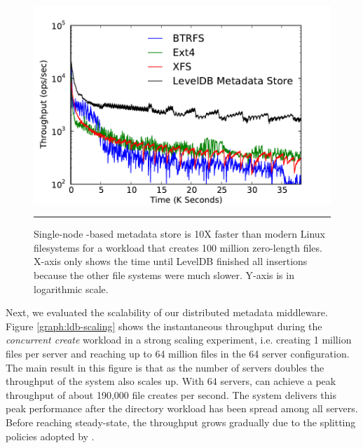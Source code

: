 \begin{figure}[t]  %
\centerline{\includegraphics[scale=0.45]{./figs/ldb_insertrate_onenode}}
\caption{
{\small 
Single-node \ldb{}-based metadata store is 10X faster than modern Linux
filesystems for a workload that creates 100 million zero-length files.
X-axis only shows the time until LevelDB finished all insertions because the other 
file systems were much slower. Y-axis is in logarithmic scale.
}
}
\vspace{10pt}
\hrule 
\label{graph:ldb-singlenode}
\end{figure}       %


Next, we evaluated the scalability of our distributed metadata middleware.
Figure \ref{graph:ldb-scaling} shows the instantaneous throughput during the 
\textit{concurrent create} workload in a strong scaling experiment, i.e.
creating 1 million files per server and reaching up to 64 million files in the
64 server configuration.
The main result in this figure is that as the number of servers doubles the
throughput of the system also scales up. With 64 servers, \giga{} can achieve a
peak throughput of about 190,000 file creates per second. The system delivers
this peak performance after the directory workload has been spread among all
servers.
Before reaching steady-state, the throughput grows gradually due to the splitting
policies adopted by \giga{}.
 

